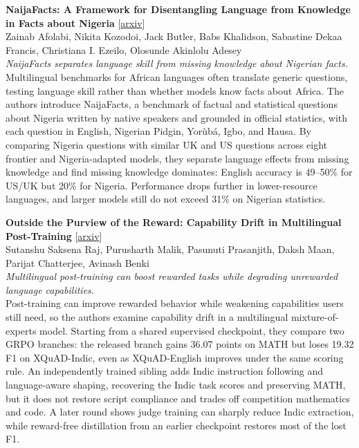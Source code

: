 \documentclass[12pt,letterpaper]{article}
\begin{document}
\medskip
\begin{minipage}{\linewidth}
{\small\textbf{NaijaFacts: A Framework for Disentangling Language from Knowledge in Facts about Nigeria}} {\scriptsize[\href{https://arxiv.org/abs/2611.06504}{arxiv}]}\\
{\scriptsize Zainab Afolabi, Nikita Kozodoi, Jack Butler, Babs Khalidson, Sabastine Dekaa Francis, Christiana I. Ezeilo, Olosunde Akinlolu Adesey}\\
{\footnotesize\textit{NaijaFacts separates language skill from missing knowledge about Nigerian facts.}}\\[2pt]
{\footnotesize Multilingual benchmarks for African languages often translate generic questions, testing language skill rather than whether models know facts about Africa. The authors introduce NaijaFacts, a benchmark of factual and statistical questions about Nigeria written by native speakers and grounded in official statistics, with each question in English, Nigerian Pidgin, Yorùbá, Igbo, and Hausa. By comparing Nigeria questions with similar UK and US questions across eight frontier and Nigeria-adapted models, they separate language effects from missing knowledge and find missing knowledge dominates: English accuracy is 49--50\% for US/UK but 20\% for Nigeria. Performance drops further in lower-resource languages, and larger models still do not exceed 31\% on Nigerian statistics.}
\end{minipage}

\medskip
\begin{minipage}{\linewidth}
{\small\textbf{Outside the Purview of the Reward: Capability Drift in Multilingual Post-Training}} {\scriptsize[\href{https://arxiv.org/abs/2611.15717}{arxiv}]}\\
{\scriptsize Sutanshu Saksena Raj, Purusharth Malik, Pasunuti Prasanjith, Daksh Maan, Parijat Chatterjee, Avinash Benki}\\
{\footnotesize\textit{Multilingual post-training can boost rewarded tasks while degrading unrewarded language capabilities.}}\\[2pt]
{\footnotesize Post-training can improve rewarded behavior while weakening capabilities users still need, so the authors examine capability drift in a multilingual mixture-of-experts model. Starting from a shared supervised checkpoint, they compare two GRPO branches: the released branch gains 36.07 points on MATH but loses 19.32 F1 on XQuAD-Indic, even as XQuAD-English improves under the same scoring rule. An independently trained sibling adds Indic instruction following and language-aware shaping, recovering the Indic task scores and preserving MATH, but it does not restore script compliance and trades off competition mathematics and code. A later round shows judge training can sharply reduce Indic extraction, while reward-free distillation from an earlier checkpoint restores most of the lost F1.}
\end{minipage}
\end{document}

